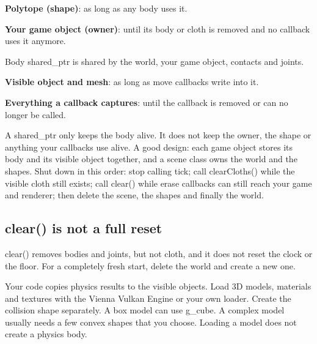 \documentclass[11pt,a4paper]{article}
\begin{document}
\textbf{Polytope (shape)}: as long as any body uses it.

\textbf{Your game object (owner)}: until its body or cloth is removed and no callback uses it anymore.

Body shared\_ptr                              is shared by the world, your game object, contacts and joints.

\textbf{Visible object and mesh}: as long as move callbacks write into it.

\textbf{Everything a callback captures}: until the callback is removed or can no longer be called.

A shared\_ptr only keeps the body alive. It does not keep the owner, the shape or anything your callbacks use alive. A good design: each game object stores its body and its visible object together, and a scene class owns the world and the shapes. Shut down in this order: stop calling tick; call clearCloths() while the visible cloth still exists; call clear() while erase callbacks can still reach your game and renderer; then delete the scene, the shapes and finally the world.

\subsection*{clear() is not a full reset}
clear() removes bodies and joints, but not cloth, and it does not reset the clock or the floor. For a completely fresh start, delete the world and create a new one.

\label{vpe-core-22}
Your code copies physics results to the visible objects. Load 3D models, materials and textures with the Vienna Vulkan Engine or your own loader. Create the collision shape separately. A box model can use g\_cube. A complex model usually needs a few convex shapes that you choose. Loading a model does not create a physics body.

\begin{center}\end{center}
\end{document}
